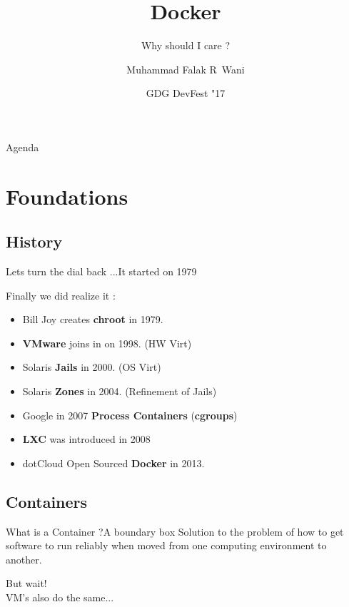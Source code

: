\documentclass{beamer}
\title{Docker}
\subtitle{Why should I care ?}
\author{Muhammad Falak R~Wani \\ \inst{falakreyaz@gmail.com}}
\institute[IIIT-D] %
{
  Cybersecurity Education and Research Centre -- {\em (CERC)} \\
  Department of Computer Science\\
  IIIT-D\\
  \centering
  \pgfuseimage{cerc-logo}

}
\date{GDG DevFest "17}
\begin{document}
\begin{frame}
	\titlepage
\end{frame}

\begin{frame}{Agenda}
	\tableofcontents
\end{frame}

\section{Foundations}

\subsection{History}

\begin{frame}{Lets turn the dial back ...}{It started on 1979 }
	\Large{
	Finally we did realize it :
	\begin{itemize}
		\item {
				Bill Joy creates \textbf{chroot} in 1979.
			}
		\item {
				\textbf{VMware} joins in on 1998. (HW Virt)
			}
		\item {
				Solaris \textbf{Jails} in 2000. (OS  Virt)
			}
		\item {
				Solaris \textbf{Zones} in 2004. (Refinement of Jails)
			}
		\item {
				Google in 2007 \textbf{Process Containers} (\textbf{cgroups})

			}
		\item {
		        \textbf{LXC} was introduced in 2008
		
		}
		\item {
		        dotCloud Open Sourced \textbf{Docker} in 2013.
		}
	\end{itemize}
	}
\end{frame}

\subsection{Containers}

\begin{frame}{What is a Container ?}{A boundary box}
{\Large Solution to the problem of how to \alert{get software to run reliably when moved} from one computing environment to another.}

\pause
\vfill{}
{\Large But wait! \\VM's also do the same...}
\end{frame}
\end{document}
